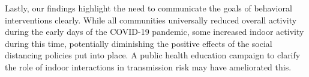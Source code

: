 \documentclass{article}
\begin{document}
Lastly, our findings highlight the need to communicate the goals of behavioral interventions clearly. While all communities universally reduced overall activity during the early days of the COVID-19 pandemic, some increased indoor activity during this time, potentially diminishing the positive effects of the social distancing policies put into place. A public health education campaign to clarify the role of indoor interactions in transmission risk may have ameliorated this.
\end{document}
